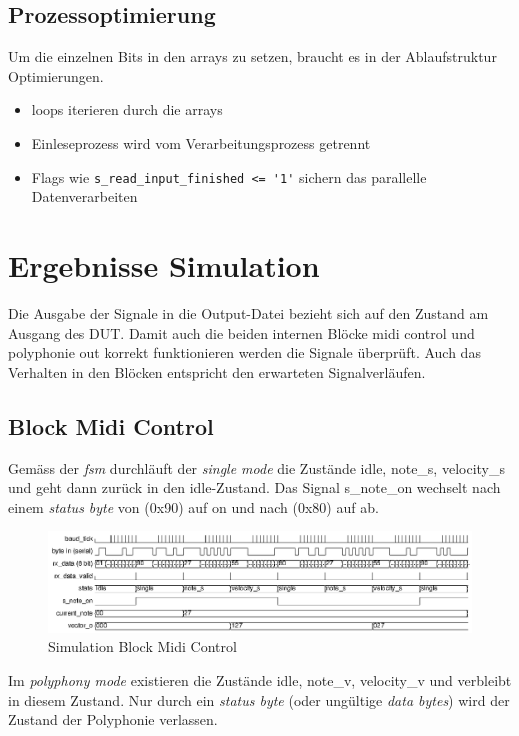 \subsection{Prozessoptimierung}

Um die einzelnen Bits in den arrays zu setzen, braucht es in der Ablaufstruktur Optimierungen.

\begin{itemize}
	\item loops iterieren durch die arrays
	\item Einleseprozess wird vom Verarbeitungsprozess getrennt
	\item Flags wie \lstinline|s_read_input_finished <= '1'| sichern das parallelle Datenverarbeiten
\end{itemize}

\section{Ergebnisse Simulation}\label{sec.ergebnisse_tests}
Die Ausgabe der Signale in die Output-Datei bezieht sich auf den Zustand am Ausgang des DUT. Damit auch die beiden internen Blöcke midi control und polyphonie out korrekt funktionieren werden die Signale überprüft. Auch das Verhalten in den Blöcken entspricht den erwarteten Signalverläufen.\\

\subsection{Block Midi Control}
Gemäss der \textit{fsm} durchläuft der \textit{single mode}  die Zustände idle, note\_s, velocity\_s und geht dann zurück  in den idle-Zustand. Das Signal s\_note\_on wechselt nach einem \textit{status byte} von (0x90) auf on und nach (0x80) auf ab.
\begin{figure}[H]
	\includegraphics[width=1\textwidth]{images/midi_control/wave_single.png}
	\caption{Simulation Block Midi Control}
	\label{fig.test_midi:control_single}
\end{figure} 

Im \textit{polyphony mode} existieren die Zustände idle, note\_v, velocity\_v und verbleibt in diesem Zustand. Nur durch ein \textit{status byte} (oder ungültige \textit{data bytes}) wird der Zustand der Polyphonie verlassen.

